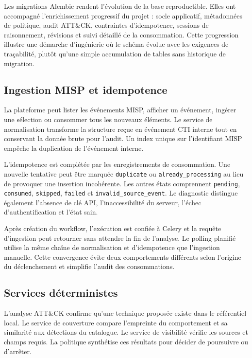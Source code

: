 Les migrations Alembic rendent l'évolution de la base reproductible. Elles ont accompagné l'enrichissement progressif du projet : socle applicatif, métadonnées de politique, audit ATT\&CK, contraintes d'idempotence, sessions de raisonnement, révisions et suivi détaillé de la consommation. Cette progression illustre une démarche d'ingénierie où le schéma évolue avec les exigences de traçabilité, plutôt qu'une simple accumulation de tables sans historique de migration.

\subsection{Ingestion MISP et idempotence}

La plateforme peut lister les événements MISP, afficher un événement, ingérer une sélection ou consommer tous les nouveaux éléments. Le service de normalisation transforme la structure reçue en événement CTI interne tout en conservant la donnée brute pour l'audit. Un index unique sur l'identifiant MISP empêche la duplication de l'événement interne.

L'idempotence est complétée par les enregistrements de consommation. Une nouvelle tentative peut être marquée \texttt{duplicate} ou \texttt{already\_processing} au lieu de provoquer une insertion incohérente. Les autres états comprennent \texttt{pending}, \texttt{consumed}, \texttt{skipped}, \texttt{failed} et \texttt{invalid\_source\_event}. Le diagnostic distingue également l'absence de clé API, l'inaccessibilité du serveur, l'échec d'authentification et l'état sain.

Après création du workflow, l'exécution est confiée à Celery et la requête d'ingestion peut retourner sans attendre la fin de l'analyse. Le polling planifié utilise la même chaîne de normalisation et d'idempotence que l'ingestion manuelle. Cette convergence évite deux comportements différents selon l'origine du déclenchement et simplifie l'audit des consommations.

\subsection{Services déterministes}

L'analyse ATT\&CK confirme qu'une technique proposée existe dans le référentiel local. Le service de couverture compare l'empreinte du comportement et sa similarité aux détections du catalogue. Le service de visibilité vérifie les sources et champs requis. La politique synthétise ces résultats pour décider de poursuivre ou d'arrêter.

